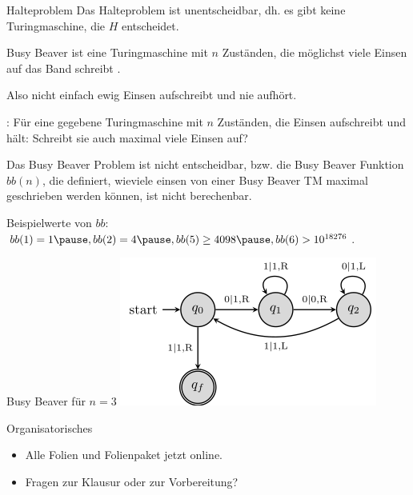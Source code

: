 \documentclass{beamer}
\begin{document}
\begin{frame}{Halteproblem}
	Das Halteproblem ist unentscheidbar\ip, dh. es gibt keine Turingmaschine, die $H$ entscheidet.
\end{frame}

\begin{frame}{Busy Beaver}
	 ist eine Turingmaschine mit $n$ Zuständen, die möglichst viele Einsen auf das Band schreibt .
	
	\begin{itemize}
		\pitem Also nicht einfach ewig Einsen aufschreibt und nie aufhört.
	\end{itemize}
	
	\bp
	
	: Für eine gegebene Turingmaschine mit $n$ Zuständen, die Einsen aufschreibt und hält: Schreibt sie auch maximal viele Einsen auf?
	
	\bp
	\vspace{.2cm}
	
	Das Busy Beaver Problem ist nicht entscheidbar, bzw. die Busy Beaver Funktion $bb(n)$, die definiert, wieviele einsen von einer Busy Beaver TM maximal geschrieben werden können, ist nicht berechenbar.
	
	\bp
	
	\vspace{.2cm}
	
	Beispielwerte von $bb$: $bb(1) = 1\ip, bb(2) = 4\ip, bb(5) \geq 4098\ip, bb(6) > 10^{18276}$.
\end{frame}

\begin{frame}{Busy Beaver für $n = 3$}
	\includegraphics[scale=0.8]{images/turingmaschine_bb.png}	
\end{frame}

\begin{frame}{Organisatorisches}
	\begin{itemize}
		\item Alle Folien und Folienpaket jetzt online.
		\item Fragen zur Klausur oder zur Vorbereitung?
	\end{itemize}
\end{frame}


\end{document}
